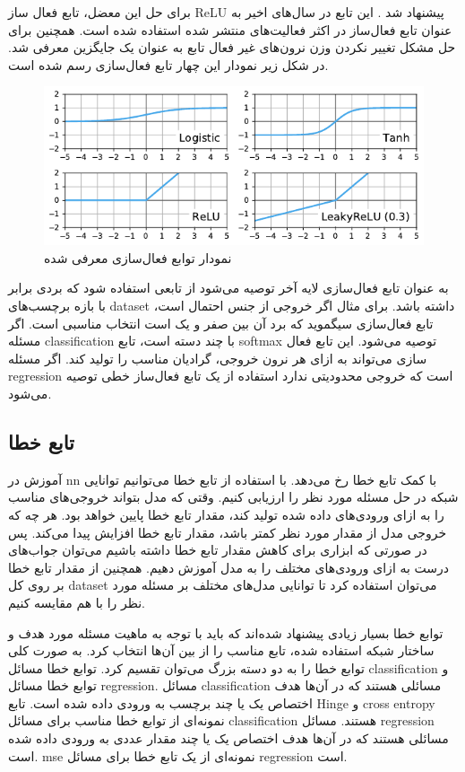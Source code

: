 برای حل این معضل، تابع فعال ساز ReLU پیشنهاد شد \cite{glorot2011deep}. این تابع
در سال‌های اخیر به عنوان تابع فعال‌ساز در اکثر فعالیت‌های منتشر شده استفاده شده
است. همچنین برای حل مشکل تغییر نکردن وزن نرون‌های غیر فعال تابع 
به عنوان یک جایگزین معرفی شد. در شکل زیر نمودار این چهار تابع فعال‌سازی رسم شده
است.
\begin{figure}[ht]
    \centering
    \includegraphics[width=12cm]{./statics/activation_functions.png}
    \caption{نمودار توابع فعال‌سازی معرفی شده}
\end{figure}

به عنوان تابع فعال‌سازی لایه آخر توصیه می‌شود از تابعی استفاده شود که بردی برابر
با بازه برچسب‌های \gls{dataset} داشته باشد. برای مثال اگر خروجی از جنس احتمال
است، تابع فعال‌سازی سیگموید که برد آن بین صفر و یک است انتخاب مناسبی است. اگر
مسئله \gls{classification} با چند دسته است، تابع softmax توصیه می‌شود. این تابع
فعال سازی می‌تواند به ازای هر نرون خروجی، گرادیان مناسب را تولید کند. اگر مسئله
\gls{regression} است که خروجی محدودیتی ندارد استفاده از یک تابع فعال‌ساز خطی
توصیه می‌شود.

\subsection{تابع خطا}
آموزش در \gls{nn} با کمک تابع خطا رخ می‌دهد. با استفاده از تابع خطا می‌توانیم
توانایی شبکه در حل مسئله مورد نظر را ارزیابی کنیم. وقتی که مدل بتواند خروجی‌های
مناسب را به ازای ورودی‌های داده شده تولید کند، مقدار تابع خطا پایین خواهد بود.
هر چه که خروجی مدل از مقدار مورد نظر کمتر باشد، مقدار تابع خطا افزایش پیدا
می‌کند. پس در صورتی که ابزاری برای کاهش مقدار تابع خطا داشته باشیم می‌توان
جواب‌های درست به ازای ورودی‌های مختلف را به مدل آموزش دهیم. همچنین از مقدار تابع
خطا بر روی کل \gls{dataset} می‌توان استفاده کرد تا توانایی مدل‌های مختلف بر
مسئله مورد نظر را با هم مقایسه کنیم.

توابع خطا بسیار زیادی پیشنهاد شده‌اند که باید با توجه به ماهیت مسئله مورد هدف و
ساختار شبکه استفاده شده، تابع مناسب را از بین آن‌ها انتخاب کرد. به صورت کلی
توابع خطا را به دو دسته بزرگ می‌توان تقسیم کرد. توابع خطا مسائل
\gls{classification} و توابع خطا مسائل \gls{regression}. مسائل
\gls{classification} مسائلی هستند که در آن‌ها هدف اختصاص یک یا چند برچسب به
ورودی داده شده است. تابع Hinge و \gls{cross entropy} نمونه‌ای از توابع خطا مناسب
برای مسائل \gls{classification} هستند. مسائل \gls{regression} مسائلی هستند که در
آن‌ها هدف اختصاص یک یا چند مقدار عددی به ورودی داده شده است. \gls{mse} نمونه‌ای
از یک تابع خطا برای مسائل \gls{regression} است.

